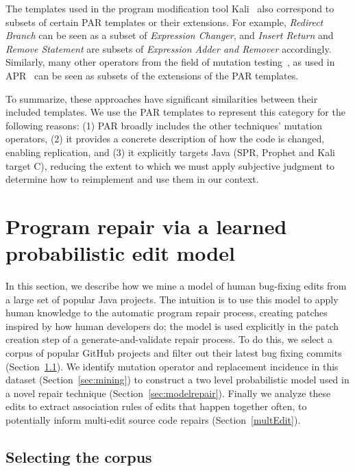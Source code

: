 \documentclass[conference]{IEEEtran}
\begin{document}
The templates used in the program modification tool Kali~\cite{Qi15}
also correspond to subsets of certain PAR templates or their extensions. 
For example, \emph{Redirect Branch} can be seen as
a subset of \emph{Expression Changer}, and \emph{Insert Return} and \emph{Remove Statement} are
subsets of \emph{Expression Adder and Remover} accordingly. Similarly,
many other operators from the field of mutation testing~\cite{Offutt06}, as used in
APR~\cite{debroy10,xuan16} can be seen as subsets of the extensions of the 
PAR templates.  

To summarize, these approaches have significant similarities between their
included templates.  We use the PAR templates to represent this category
for the following reasons: (1) PAR broadly includes the other techniques' mutation operators, (2) it
provides a concrete description of how the code is changed, enabling
replication, and (3) it explicitly targets Java (SPR, Prophet and Kali
target C), reducing the extent to which we must apply subjective judgment to
determine how to reimplement and use them in our context.

\section{Program repair via a learned probabilistic edit model} \label{buildingTheModel}

In this section, we describe how we mine a model of human
bug-fixing edits from a large set of popular Java projects. The intuition is to
use this model to
apply human knowledge to the automatic program repair process, 
creating patches inspired by how human developers do; the model is used
explicitly in the patch creation step of a generate-and-validate repair process. To do this, we
select a corpus of popular GitHub projects and filter out their latest bug
fixing commits (Section~\ref{sec:corpus}).  We identify mutation operator and
replacement incidence in this dataset  (Section~\ref{sec:mining}) to construct a two level probabilistic
model used in a novel repair technique (Section~\ref{sec:modelrepair}). Finally we
analyze these edits to extract association rules of 
edits that happen together often, to potentially inform multi-edit source
code repairs (Section~\ref{multEdit}).

\subsection{Selecting the corpus}
\label{sec:corpus}
\end{document}
